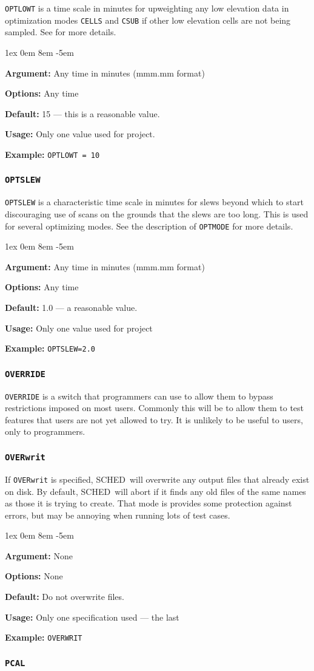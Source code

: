 \documentclass{report}
\newcommand{\schedb}{{\sc SCHED~}}
\newcommand{\rcwbox}[5]{
  \begin{list}{}{\parsep 1ex  \itemsep 0em
                 \leftmargin 8em  \itemindent -5em }
    \item {\bf Argument:} #1
    \item {\bf Options:}  #2
    \item {\bf Default:}  #3
    \item {\bf Usage:}    #4
    \item {\bf Example:}  #5
  \end{list}
}
\begin{document}
{\tt OPTLOWT} is a time scale in minutes for upweighting any low
elevation data in optimization modes {\tt CELLS} and {\tt CSUB} if
other low elevation cells are not being sampled.  See  for more details.

\rcwbox
{Any time in minutes (mmm.mm format) }
{Any time}
{15 --- this is a reasonable value.}
{Only one value used for project.}
{{\tt OPTLOWT = 10}}

\subsubsection{\label{MP:OPTSLEW}{\tt OPTSLEW}}

{\tt OPTSLEW} is a characteristic time scale in minutes for slews
beyond which to start discouraging use of scans on the grounds that
the slews are too long.  This is used for several optimizing modes.
See the description of {\tt OPTMODE} for more details.

\rcwbox
{Any time in minutes (mmm.mm format)}
{Any time}
{1.0 --- a reasonable value.}
{Only one value used for project}
{{\tt OPTSLEW=2.0}}


\subsubsection{\label{MP:OVERRIDE}{\tt OVERRIDE}}

{\tt OVERRIDE} is a switch that programmers can use to allow them to
bypass restrictions imposed on most users.  Commonly this will be to
allow them to test features that users are not yet allowed to try. It is
unlikely to be useful to users, only to programmers.


\subsubsection{\label{MP:OVERWRIT}{\tt OVERwrit}}

If {\tt OVERwrit} is specified, \schedb will overwrite any output
files that already exist on disk.  By default, \schedb will abort
if it finds any old files of the same names as those it is trying to
create.  That mode is provides some protection against errors, but
may be annoying when running lots of test cases.

\rcwbox
{None}
{None}
{Do not overwrite files.}
{Only one specification used --- the last}
{{\tt OVERWRIT}}


\subsubsection{\label{MP:PCAL}{\tt PCAL}}
\end{document}
